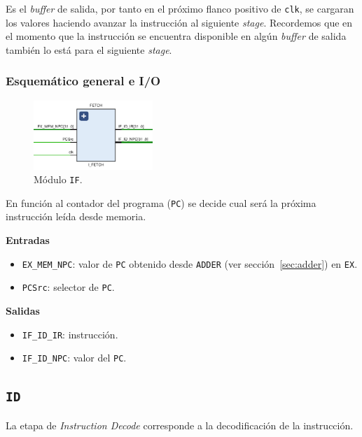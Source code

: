 \documentclass[a4paper]{article}
\begin{document}
Es el \textit{buffer} de salida, por tanto en el próximo flanco positivo de \texttt{clk}, se cargaran los valores haciendo avanzar la instrucción al siguiente \textit{stage}. Recordemos que en el momento que la instrucción se encuentra disponible en algún \textit{buffer} de salida también lo está para el siguiente \textit{stage}.

\subsubsection{Esquemático general e I/O}

\begin{figure}[H]
	\begin{center}				
	\includegraphics[width=0.40\textwidth]{TP4_1.png}
  	\caption{Módulo \texttt{IF}.}
  	\label{fig:funcionamiento.}
  	\end{center}
\end{figure}

En función al contador del programa (\texttt{PC}) se decide cual será la próxima instrucción leída desde memoria.

\textbf{Entradas}
\begin{itemize}
	\item \texttt{EX\_MEM\_NPC}: valor de \texttt{PC} obtenido desde \texttt{ADDER} (ver sección~\ref{sec:adder}) en \texttt{EX}.
	\item \texttt{PCSrc}: selector de \texttt{PC}.
\end{itemize}

\textbf{Salidas}
\begin{itemize}
	\item \texttt{IF\_ID\_IR}: instrucción.
	\item \texttt{IF\_ID\_NPC}: valor del \texttt{PC}.
\end{itemize}

\subsection{\texttt{ID}}
La etapa de \textit{Instruction Decode} corresponde a la decodificación de la instrucción.
\end{document}
